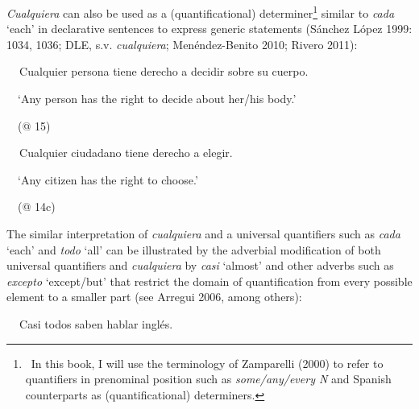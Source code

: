 \begin{styleStandard}
\textit{Cualquiera} can also be used as a (quantificational) determiner\footnote{\textrm{\ In this book, I will use the terminology of Zamparelli (2000) to refer to quantifiers in prenominal position such as }\textrm{\textit{some/any/every N}}\textrm{ and Spanish counterparts as (quantificational) determiners.}} similar to\textit{ cada} ‘each’ in declarative sentences to express generic statements (Sánchez López 1999: 1034, 1036; DLE, s.v. \textit{cualquiera}; Menéndez-Benito 2010; Rivero 2011):
\end{styleStandard}

\begin{styleStandard}
\textbf{\ \ }Cualquier persona tiene derecho a decidir sobre su cuerpo.
\end{styleStandard}

\begin{styleStandard}
\ \ ‘Any person has the right to decide about her/his body.’
\end{styleStandard}

\begin{styleStandard}
\ \ (@ 15)
\end{styleStandard}

\begin{styleStandard}
\textbf{\ \ }Cualquier ciudadano tiene derecho a elegir. 
\end{styleStandard}

\begin{styleStandard}
\ \ ‘Any citizen has the right to choose.’
\end{styleStandard}

\begin{styleStandard}
\ \ (@ 14c)
\end{styleStandard}

\begin{styleStandard}
The similar interpretation of \textit{cualquiera} and a universal quantifiers such as \textit{cada }‘each’\textit{ }and \textit{todo} ‘all’ can be illustrated by the adverbial modification of both universal quantifiers and \textit{cualquiera} by \textit{casi} ‘almost’ and other adverbs such as \textit{excepto} ‘except/but’ that restrict the domain of quantification from every possible element to a smaller part (see Arregui 2006, among others):
\end{styleStandard}

\begin{styleStandard}
\textbf{\ \ }Casi todos saben hablar inglés. 
\end{styleStandard}

